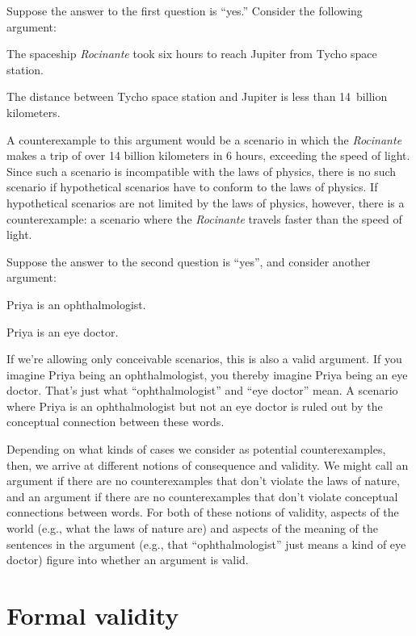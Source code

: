Suppose the answer to the first question is ``yes.'' Consider the following argument:
	\begin{earg}
		\item[] The spaceship \textit{Rocinante} took six hours to reach Jupiter from Tycho space station.
		\item[\texttherefore] The distance between Tycho space station and Jupiter is less than 14~billion kilometers.
	\end{earg}
A counterexample to this argument would be a scenario in which the \textit{Rocinante} makes a trip of over 14 billion kilometers in 6 hours, exceeding the speed of light. Since such a scenario is incompatible with the laws of physics, there is no such scenario if hypothetical scenarios have to conform to the laws of physics.  If hypothetical scenarios are not limited by the laws of physics, however, there is a counterexample: a scenario where the \textit{Rocinante} travels faster than the speed of light.

Suppose the answer to the second question is ``yes'', and consider another argument:
	\begin{earg}
		\item[] Priya is an ophthalmologist.
		\item[\texttherefore] Priya is an eye doctor.
	\end{earg}
If we're allowing only conceivable scenarios, this is also a valid argument. If you imagine Priya being an ophthalmologist, you thereby imagine Priya being an eye doctor. That's just what ``ophthalmologist'' and ``eye doctor'' mean.  A scenario where Priya is an ophthalmologist but not an eye doctor is ruled out by the conceptual connection between these words.

Depending on what kinds of cases we consider as potential counterexamples, then, we arrive at different notions of consequence and validity. We might call an argument  if there are no counterexamples that don't violate the laws of nature, and an argument  if there are no counterexamples that don't violate conceptual connections between words.
For both of these notions of validity, aspects of the world (e.g., what the laws of nature are) and aspects of the meaning of the sentences in the argument (e.g., that ``ophthalmologist'' just means a kind of eye doctor) figure into whether an argument is valid.

\section{Formal validity}

